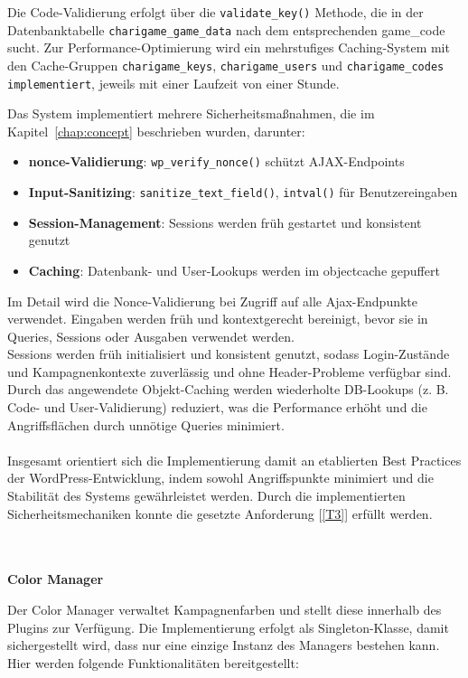Die Code-Validierung erfolgt über die \texttt{validate\_key()} Methode, die in der Datenbanktabelle \texttt{charigame\_game\_data} nach dem entsprechenden game\_code sucht.
Zur Performance-Optimierung wird ein mehrstufiges Caching-System mit den Cache-Gruppen \texttt{charigame\_keys}, \texttt{charigame\_users} und \texttt{charigame\_codes implementiert}, jeweils mit einer Laufzeit von einer Stunde.

Das System implementiert mehrere Sicherheitsmaßnahmen, die im Kapitel~\ref{chap:concept} beschrieben wurden, darunter:

\begin{itemize}
    \item \textbf{\gls{nonce}-Validierung}: \texttt{wp\_verify\_nonce()} schützt AJAX-Endpoints
    \item \textbf{Input-Sanitizing}: \texttt{sanitize\_text\_field()}, \texttt{intval()} für Benutzereingaben
    \item \textbf{Session-Management}: Sessions werden früh gestartet und konsistent genutzt
    \item \textbf{Caching}: Datenbank- und User-Lookups werden im \gls{objectcache} gepuffert
\end{itemize}

Im Detail wird die Nonce-Validierung bei Zugriff auf alle Ajax-Endpunkte verwendet.
Eingaben werden früh und kontextgerecht bereinigt, bevor sie in Queries, Sessions oder Ausgaben verwendet werden.\\
Sessions werden früh initialisiert und konsistent genutzt, sodass Login-Zustände und Kampagnenkontexte zuverlässig und ohne Header-Probleme verfügbar sind.\\
Durch das angewendete Objekt-Caching werden wiederholte DB-Lookups (z. B. Code- und User-Validierung) reduziert, was die Performance erhöht und die Angriffsflächen durch unnötige Queries minimiert.
\\\\
Insgesamt orientiert sich die Implementierung damit an etablierten Best Practices der WordPress-Entwicklung, indem sowohl Angriffspunkte minimiert und die Stabilität des Systems gewährleistet werden.
Durch die implementierten Sicherheitsmechaniken konnte die gesetzte Anforderung [\ref{T3}] erfüllt werden.

\\\\
\textbf{Color Manager}

Der Color Manager verwaltet Kampagnenfarben und stellt diese innerhalb des Plugins zur Verfügung.
Die Implementierung erfolgt als Singleton-Klasse, damit sichergestellt wird, dass nur eine einzige Instanz des Managers bestehen kann.
Hier werden folgende Funktionalitäten bereitgestellt:

